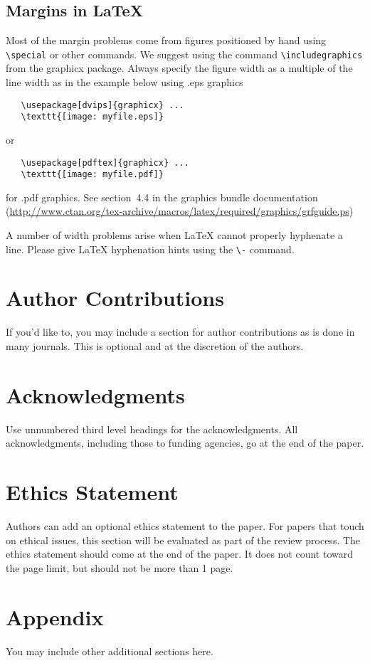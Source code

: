 \documentclass{article} %
\begin{document}
\subsection{Margins in LaTeX}

Most of the margin problems come from figures positioned by hand using
\verb+\special+ or other commands. We suggest using the command
\verb+\includegraphics+
from the graphicx package. Always specify the figure width as a multiple of
the line width as in the example below using .eps graphics
\begin{verbatim}
   \usepackage[dvips]{graphicx} ...
   \texttt{[image: myfile.eps]}
\end{verbatim}
or %
\begin{verbatim}
   \usepackage[pdftex]{graphicx} ...
   \texttt{[image: myfile.pdf]}
\end{verbatim}
for .pdf graphics.
See section~4.4 in the graphics bundle documentation (\url{http://www.ctan.org/tex-archive/macros/latex/required/graphics/grfguide.ps})

A number of width problems arise when LaTeX cannot properly hyphenate a
line. Please give LaTeX hyphenation hints using the \verb+\-+ command.

\section*{Author Contributions}
If you'd like to, you may include  a section for author contributions as is done
in many journals. This is optional and at the discretion of the authors.

\section*{Acknowledgments}
Use unnumbered third level headings for the acknowledgments. All
acknowledgments, including those to funding agencies, go at the end of the paper.

\section*{Ethics Statement}
Authors can add an optional ethics statement to the paper. 
For papers that touch on ethical issues, this section will be evaluated as part of the review process. The ethics statement should come at the end of the paper. It does not count toward the page limit, but should not be more than 1 page. 






\appendix
\section{Appendix}
You may include other additional sections here.
\end{document}

